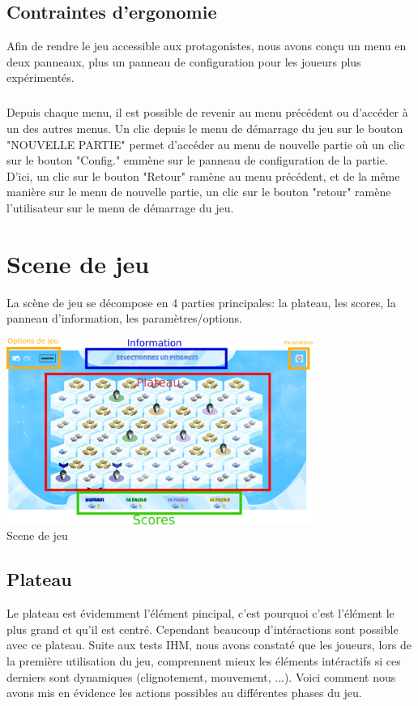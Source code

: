 \documentclass{report}
\begin{document}
 \section{ Contraintes d'ergonomie }
 
 Afin de rendre le jeu accessible aux protagonistes, nous avons conçu un menu en deux panneaux, plus un panneau de configuration pour les joueurs plus expérimentés.
 
 \paragraph{}
 Depuis chaque menu, il est possible de revenir au menu précédent ou d'accéder à un des autres menus. Un clic depuis le menu de démarrage du jeu sur le bouton "NOUVELLE PARTIE" permet d'accéder au menu de nouvelle partie où un clic sur le bouton "Config." emmène sur le panneau de configuration de la partie. D'ici, un clic sur le bouton "Retour" ramène au menu précédent, et de la même manière sur le menu de nouvelle partie, un clic sur le bouton "retour" ramène l'utilisateur sur le menu de démarrage du jeu.


\chapter{Scene de jeu}
La scène de jeu se décompose en 4 parties principales: la plateau, les scores, la panneau d'information, les paramètres/options.

\begin{center}
  \includegraphics[width=10cm]{image/plateauIHM.png}
  \\
  Scene de jeu
\end{center}

\section{Plateau}
Le plateau est évidemment l'élément pincipal, c'est pourquoi c'est l'élément le plus grand et qu'il est centré. Cependant beaucoup d'intéractions sont possible avec ce plateau. Suite aux tests IHM,
nous avons constaté que les joueurs, lors de la première utilisation du jeu, comprennent mieux les éléments intéractifs si ces derniers sont dynamiques (clignotement, mouvement, ...). Voici comment nous avons mis en évidence les actions possibles au différentes phases du jeu.
\end{document}
